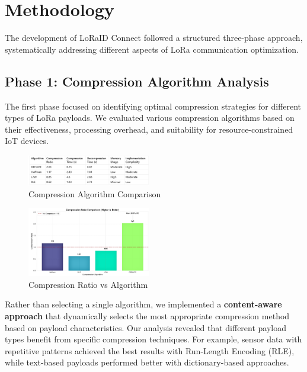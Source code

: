 \documentclass[conference]{IEEEtran}
\begin{document}
\section{Methodology}
The development of LoRaID Connect followed a structured three-phase approach, systematically addressing different aspects of LoRa communication optimization.

\subsection{Phase 1: Compression Algorithm Analysis}
The first phase focused on identifying optimal compression strategies for different types of LoRa payloads. We evaluated various compression algorithms based on their effectiveness, processing overhead, and suitability for resource-constrained IoT devices.

\begin{figure}[htbp]
\centering
\includegraphics[width=0.48\textwidth]{images/compression-algorithm-comparison.png}
\caption{Compression Algorithm Comparison}
\label{fig:compression_comparison}
\end{figure}

\begin{figure}[htbp]
\centering
\includegraphics[width=0.48\textwidth]{images/compression-ratio-vs-algorithm.png}
\caption{Compression Ratio vs Algorithm}
\label{fig:compression_ratio}
\end{figure}

Rather than selecting a single algorithm, we implemented a \textbf{content-aware approach} that dynamically selects the most appropriate compression method based on payload characteristics. Our analysis revealed that different payload types benefit from specific compression techniques. For example, sensor data with repetitive patterns achieved the best results with Run-Length Encoding (RLE), while text-based payloads performed better with dictionary-based approaches.
\end{document}
